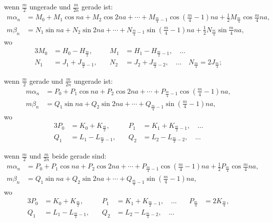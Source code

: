\documentclass[12pt,a4paper]{article}
\begin{document}
wenn $\frac{m}{2}$ ungerade und $\frac{m}{2n}$ gerade ist:
\begin{equation}
\tag{11}
\begin{aligned}
m\alpha_n &= M_0 + M_1 \cos na + M_2 \cos 2na + \cdots + M_{\frac{m}{4}-1} \cos(\tfrac{m}{4}-1)na + \tfrac{1}{2}M_{\frac{m}{4}} \cos\tfrac{m}{4}na,\\
m\beta_n &= N_1 \sin na + N_2 \sin 2na + \cdots + N_{\frac{m}{4}-1} \sin(\tfrac{m}{4}-1)na + \tfrac{1}{2}N_{\frac{m}{4}} \sin\tfrac{m}{4}na,
\end{aligned}
\end{equation}
wo
\begin{alignat*}{3}
M_0 &= H_0 - H_{\frac{m}{2}}, \quad & M_1 &= H_1 - H_{\frac{m}{2}-1}, \quad \ldots\\
N_1 &= J_1 + J_{\frac{m}{2}-1}, \quad & N_2 &= J_2 + J_{\frac{m}{2}-2}, \quad \ldots \quad N_{\frac{m}{4}} = 2J_{\frac{m}{4}};
\end{alignat*}

wenn $\frac{m}{2}$ gerade und $\frac{m}{2n}$ ungerade ist:
\begin{equation}
\tag{12}
\begin{aligned}
m\alpha_n &= P_0 + P_1 \cos na + P_2 \cos 2na + \cdots + P_{\frac{m}{4}-1} \cos(\tfrac{m}{4}-1)na,\\
m\beta_n &= Q_1 \sin na + Q_2 \sin 2na + \cdots + Q_{\frac{m}{4}-1} \sin(\tfrac{m}{4}-1)na,
\end{aligned}
\end{equation}
wo
\begin{alignat*}{3}
P_0 &= K_0 + K_{\frac{m}{2}}, \quad & P_1 &= K_1 + K_{\frac{m}{2}-1}, \quad \ldots\\
Q_1 &= L_1 - L_{\frac{m}{2}-1}, \quad & Q_2 &= L_2 - L_{\frac{m}{2}-2}, \quad \ldots
\end{alignat*}

wenn $\frac{m}{2}$ und $\frac{m}{2n}$ beide gerade sind:
\begin{equation}
\tag{13}
\begin{aligned}
m\alpha_n &= P_0 + P_1 \cos na + P_2 \cos 2na + \cdots + P_{\frac{m}{4}-1} \cos(\tfrac{m}{4}-1)na + \tfrac{1}{2}P_{\frac{m}{4}} \cos\tfrac{m}{4}na,\\
m\beta_n &= Q_1 \sin na + Q_2 \sin 2na + \cdots + Q_{\frac{m}{4}-1} \sin(\tfrac{m}{4}-1)na,
\end{aligned}
\end{equation}
wo
\begin{alignat*}{3}
P_0 &= K_0 + K_{\frac{m}{2}}, \quad & P_1 &= K_1 + K_{\frac{m}{2}-1}, \quad \ldots \quad & P_{\frac{m}{4}} &= 2K_{\frac{m}{4}},\\
Q_1 &= L_1 - L_{\frac{m}{2}-1}, \quad & Q_2 &= L_2 - L_{\frac{m}{2}-2}, \quad \ldots
\end{alignat*}
\end{document}
